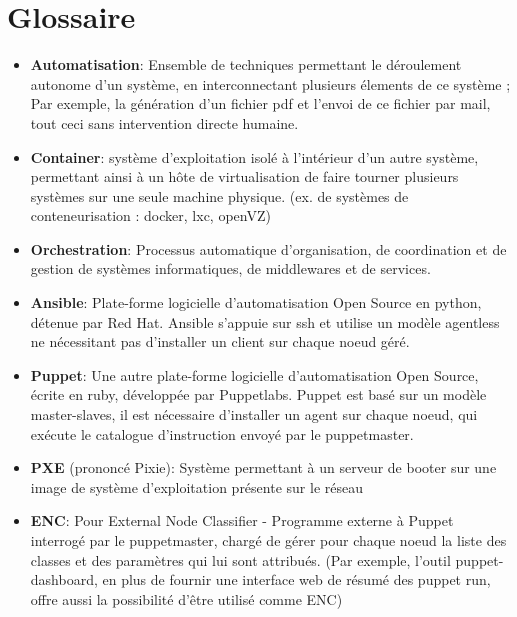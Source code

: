 \documentclass[14 pt]{extreport}
\begin{document}
\chapter*{Glossaire}

\begin{itemize}

\item{\textbf{Automatisation}}: Ensemble de techniques permettant le déroulement autonome d'un système, en interconnectant plusieurs élements de ce système ; Par exemple, la génération d'un fichier pdf et l'envoi de ce fichier par mail, tout ceci sans intervention directe humaine.

\item{\textbf{Container}}: système d'exploitation isolé à l'intérieur d'un autre système, permettant ainsi à un hôte de virtualisation de faire tourner plusieurs systèmes sur une seule machine physique. (ex. de systèmes de conteneurisation : docker, lxc, openVZ)

\item{\textbf{Orchestration}}: Processus automatique d'organisation, de coordination et de gestion de systèmes informatiques, de middlewares et de services.

\item{\textbf{Ansible}}: Plate-forme logicielle d'automatisation Open Source en python, détenue par Red Hat. Ansible s'appuie sur ssh et utilise un modèle agentless ne nécessitant pas d'installer un client sur chaque noeud géré.

\item{\textbf{Puppet}}: Une autre plate-forme logicielle d'automatisation Open Source, écrite en ruby, développée par Puppetlabs. Puppet est basé sur un modèle master-slaves, il est nécessaire d'installer un agent sur chaque noeud, qui exécute le catalogue d'instruction envoyé par le puppetmaster.

\item{\textbf{PXE}} (prononcé Pixie): Système permettant à un serveur de booter sur une image de système d'exploitation présente sur le réseau

\item{\textbf{ENC}}: Pour External Node Classifier - Programme externe à Puppet interrogé par le puppetmaster, chargé de gérer pour chaque noeud la liste des classes et des paramètres qui lui sont attribués. (Par exemple, l'outil puppet-dashboard, en plus de fournir une interface web de résumé des puppet run, offre aussi la possibilité d'être utilisé comme ENC)

\end{itemize}
\end{document}
